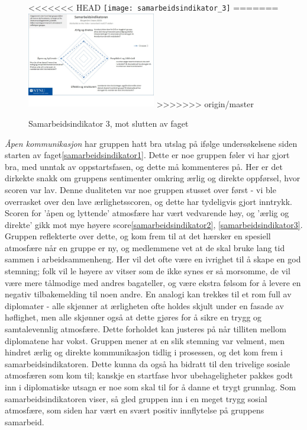 \begin{figure}[h!]
  \caption{Samarbeidsindikator 3, mot slutten av faget}
  \centering
<<<<<<< HEAD
    \texttt{[image: samarbeidsindikator\_3]}
=======
    \includegraphics[width=0.5\textwidth]{Bilder/samarbeidsindikator_3.jpg}
>>>>>>> origin/master
\end{figure}\label{samarbeidsindikator3}

\emph{Åpen kommunikasjon} har gruppen hatt bra utslag på ifølge undersøkelsene siden starten av faget\ref{samarbeidsindikator1}. Dette er noe gruppen føler vi har gjort bra, med unntak av oppstartsfasen, og dette må kommenteres på. Her er det dirkekte snakk om gruppens sentimenter omkring ærlig og direkte oppførsel, hvor scoren var lav. Denne dualiteten var noe gruppen stusset over først - vi ble overrasket over den lave ærlighetsscoren, og dette har tydeligvis gjort inntrykk. Scoren for 'åpen og lyttende' atmosfære har vært vedvarende høy, og 'ærlig og direkte' gikk mot mye høyere score\ref{samarbeidsindikator2}, \ref{samarbeidsindikator3}.
Gruppen reflekterte over dette, og kom frem til at det hærsker en spesiell atmosfære når en gruppe er ny, og medlemmene vet at de skal bruke lang tid sammen i arbeidsammenheng. Her vil det ofte være en ivrighet til å skape en god stemning; folk vil le høyere av vitser som de ikke synes er så morsomme, de vil være mere tålmodige med andres bagateller, og være ekstra følsom for å levere en negativ tilbakemelding til noen andre. En analogi kan trekkes til et rom full av diplomater - alle skjønner at ærligheten ofte holdes skjult under en fasade av høflighet, men alle skjønner også at dette gjøres for å sikre en trygg og samtalevennlig atmosfære. Dette forholdet kan justeres på når tilliten mellom diplomatene har vokst. Gruppen mener at en slik stemning var velment, men hindret ærlig og direkte kommunikasjon tidlig i prosessen, og det kom frem i samarbeidsindikatoren.
Dette kunna da også ha bidratt til den trivelige sosiale atmosfæren som kom til; kanskje en startfase hvor ubehageligheter pakkes godt inn i diplomatiske utsagn er noe som skal til for å danne et trygt grunnlag. Som samarbeidsindikatoren viser, så gled gruppen inn i en meget trygg sosial atmosfære, som siden har vært en svært positiv innflytelse på gruppens samarbeid.

